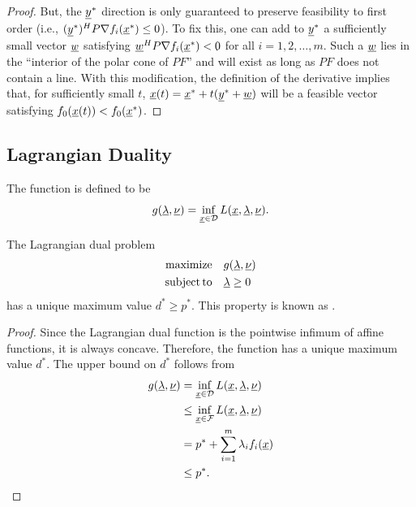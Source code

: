 \begin{proof}
But, the $\underline{y}^*$ direction is only guaranteed to preserve feasibility to first order (i.e., $(\underline{y}^*)^H P \nabla f_i (\underline{x}^*) \leq 0$).
To fix this, one can add to $\underline{y}^*$ a sufficiently small vector $\underline{w}$ satisfying $\underline{w}^H P \nabla f_i (\underline{x}^*) < 0$ for all $i=1,2,\ldots,m$.
Such a $\underline{w}$ lies in the ``interior of the polar cone of $PF$'' and will exist as long as $PF$ does not contain a line.
With this modification, the definition of the derivative implies that, for sufficiently small $t$, $\underline{x}(t) = \underline{x}^* + t (\underline{y}^* + \underline{w})$ will be a feasible vector satisfying $f_0 (\underline{x}(t)) < f_0 (\underline{x}^*)$.
\end{proof}

\subsection{Lagrangian Duality}


\begin{definition}
The  function is defined to be
\[ g(\underline{\lambda},\underline{\nu}) = \inf_{\underline{x}\in \mathcal{D}} L(\underline{x},\underline{\lambda},\underline{\nu}). \]
\end{definition}


\begin{lemma}
The Lagrangian dual problem
\begin{align*}
\mathrm{maximize} \quad & g(\underline{\lambda},\underline{\nu}) \\
\mathrm{subject\,to} \quad & \underline{\lambda} \geq 0
\end{align*}
has a unique maximum value $d^* \geq p^*$.
This property is known as .
\end{lemma}

\begin{proof}
Since the Lagrangian dual function is the pointwise infimum of affine functions, it is always concave.
Therefore, the function has a unique maximum value $d^*$.
The upper bound on $d^*$ follows from
\begin{align*}
g(\underline{\lambda},\underline{\nu})
&= \inf_{\underline{x}\in \mathcal{D}} L(\underline{x},\underline{\lambda},\underline{\nu}) \\
&\leq \inf_{\underline{x}\in \mathcal{F}} L(\underline{x},\underline{\lambda},\underline{\nu}) \\
&= p^* + \sum_{i=1}^m \lambda_i f_i (\underline{x}) \\
&\leq p^*.
\end{align*}
\end{proof}

